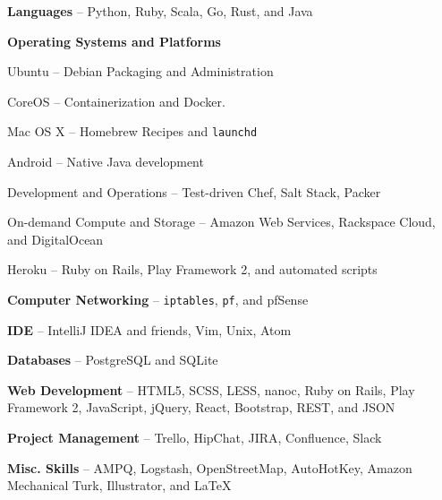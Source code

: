 \documentclass[10pt, letter]{article}
\newcommand{\reference}[4]{
\subsection*{#1 | {\footnotesize{#2}}}
#3 -- \href{mailto:#4}{\texttt{#4}}
}
\newenvironment{packed_item}{
\begin{itemize}
  \setlength{\itemsep}{1pt}
  \setlength{\parskip}{0pt}
  \setlength{\parsep}{0pt}
}{\end{itemize}}
\begin{document}
\begin{multicols}{2}
\begin{packed_item}
    \item \textbf{Languages} -- Python, Ruby, Scala, Go, Rust, and Java
    \item \textbf{Operating Systems and Platforms}
        \begin{packed_item}
            \item Ubuntu -- Debian Packaging and Administration
            \item CoreOS -- Containerization and Docker.
            \item Mac OS X -- Homebrew Recipes and \texttt{launchd}
            \item Android -- Native Java development
            \item Development and Operations -- Test-driven Chef, Salt Stack, Packer
            \item On-demand Compute and Storage -- Amazon Web Services, Rackspace Cloud, and DigitalOcean
            \item Heroku -- Ruby on Rails, Play Framework 2, and automated scripts
        \end{packed_item}
    \item \textbf{Computer Networking} -- \texttt{iptables}, \texttt{pf}, and pfSense
    \item \textbf{IDE} -- IntelliJ IDEA and friends, Vim, Unix, Atom
    \item \textbf{Databases} -- PostgreSQL and SQLite
    \item \textbf{Web Development} -- HTML5, SCSS, LESS, nanoc, Ruby on Rails, Play Framework 2, JavaScript, jQuery, React, Bootstrap, REST, and JSON
    \item \textbf{Project Management} -- Trello, HipChat, JIRA, Confluence, Slack
    \item \textbf{Misc. Skills} -- AMPQ, Logstash, OpenStreetMap, AutoHotKey, Amazon Mechanical Turk, Illustrator, and \LaTeX
\end{packed_item}








\end{multicols}
\end{document}
